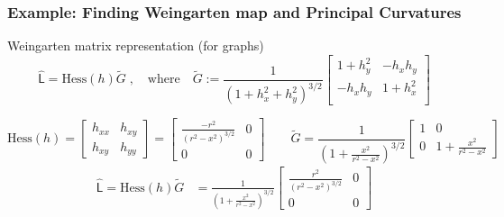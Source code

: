 \documentclass[9pt]{beamer}
\newcommand{\Hess}{\mathrm{Hess}} %
\newcommand{\weinmat}{\widehat{\mathsf{L}}}
\begin{document}
\begin{frame}
\frametitle{Example: Finding Weingarten map and Principal Curvatures}
\begin{block}{Weingarten matrix representation (for graphs)}
\begin{equation*}
\weinmat = \Hess(h) \tilde{G} \;,\quad \mathrm{where} \quad
\tilde{G} := \frac{1}{\left({1+h_x^2 + h_y^2}\right)^{3/2}}
\begin{bmatrix}
1 + h_y^2 & -h_x h_y \\
-h_x h_y & 1 + h_x^2 \\
\end{bmatrix} 
\end{equation*}
\end{block}

\begin{equation*}
\Hess (h)
  = \begin{bmatrix} h_{xx} & h_{xy} \\ h_{xy} & h_{yy} \end{bmatrix}
   = \begin{bmatrix} \frac{-r^2}{\left(r^2 - x^2\right)^{3/2}} & 0 \\ 0 & 0 \end{bmatrix}
\qquad
\tilde{G} =
  \frac{1}{\left(1+\frac{x^2}{r^2-x^2}\right)^{3/2}}
  \begin{bmatrix}
  1 & 0 \\ 0 & 1 + \frac{x^2}{r^2 - x^2}
  \end{bmatrix}
  \end{equation*}
  \begin{align*}
  \weinmat = \Hess(h)\tilde{G}
           &= \frac{1}{\left(1+\frac{x^2}{r^2-x^2}\right)^{3/2}}
              \begin{bmatrix} \frac{r^2}{\left(r^2 - x^2\right)^{3/2}} & 0 \\
              0 & 0 \end{bmatrix} \\

\end{align*}
\end{frame}
\end{document}
